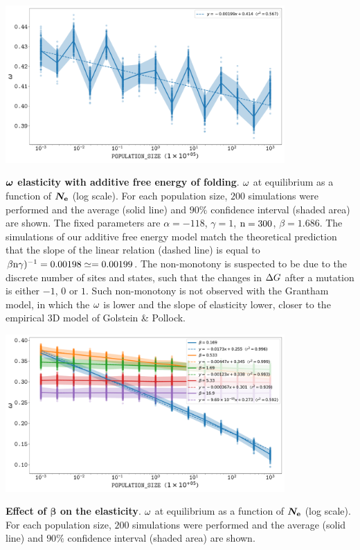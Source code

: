 \documentclass{article}
\begin{document}
\begin{center}
 \includegraphics[width=0.8\textwidth] {artworks/SimuStab-Elasticity.pdf}
\end{center}
\textbf{$\bm{\omega}$ elasticity with additive free energy of folding}.
$\omega$ at equilibrium as a function of $\bm{N_{\mathrm{e}}}$ (log scale).
For each population size, $200$ simulations were performed and the average (solid line) and $90\%$ confidence interval (shaded area) are shown.
The fixed parameters are $\alpha=-118$, $\gamma=1$, $\text{n}=300$, $\beta=1.686$.
The simulations of our additive free energy model match the theoretical prediction that the slope of the linear relation (dashed line) is equal to $\beta \text{n} \gamma)^{-1} = 0.00198 \simeq = 0.00199$.
The non-monotony is suspected to be due to the discrete number of sites and states, such that the changes in $\Delta G$ after a mutation is either $-1$, $0$ or $1$. Such non-monotony is not observed with the Grantham model, in which the $\omega$ is lower and the slope of elasticity lower, closer to the empirical 3D model of Golstein \& Pollock. 
\begin{center}
 \includegraphics[width=0.8\textwidth] {artworks/SimuStab-Grantham-Beta-Elasticity.pdf}
\end{center}
\textbf{Effect of $\bm{\beta}$ on the elasticity}.
$\omega$ at equilibrium as a function of $\bm{N_{\mathrm{e}}}$ (log scale).
For each population size, $200$ simulations were performed and the average (solid line) and $90\%$ confidence interval (shaded area) are shown.
\end{document}
